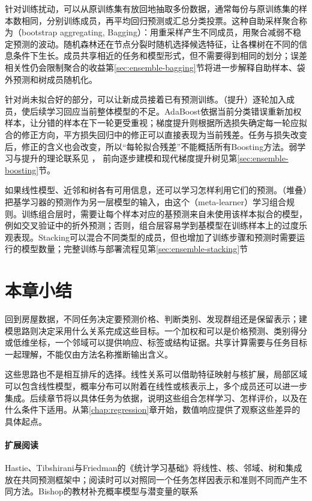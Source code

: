针对训练扰动，可以从原训练集有放回地抽取多份数据，通常每份与原训练集的样本数相同，分别训练成员，再平均回归预测或汇总分类投票。这种自助采样聚合称为（bootstrap aggregating, Bagging）：用重采样产生不同成员，用聚合减弱不稳定预测的波动。随机森林还在节点分裂时随机选择候选特征，让各棵树在不同的信息条件下生长。成员共享相近的任务和模型形式，但不需要得到相同的划分；误差相关性仍会限制聚合的收益第\ref{sec:ensemble-bagging}节将进一步解释自助样本、袋外预测和树成员随机化。

针对尚未拟合好的部分，可以让新成员接着已有预测训练。（提升）逐轮加入成员，使后续学习回应当前整体模型的不足。AdaBoost依据当前分类错误重新加权样本，让分错的样本在下一轮更受重视；梯度提升则根据所选损失确定每一轮应拟合的修正方向，平方损失回归中的修正可以直接表现为当前残差。任务与损失改变后，修正的含义也会改变，所以“每轮拟合残差”不能概括所有Boosting方法。弱学习与提升的理论联系见
，
前向逐步建模和现代梯度提升树见第\ref{sec:ensemble-boosting}节。

如果线性模型、近邻和树各有可用信息，还可以学习怎样利用它们的预测。（堆叠）把基学习器的预测作为另一层模型的输入，由这个（meta-learner）学习组合规则。训练组合层时，需要让每个样本对应的基预测来自未使用该样本拟合的模型，例如交叉验证中的折外预测；否则，组合层容易学到基模型在训练样本上的过度乐观表现。Stacking可以混合不同类型的成员，但也增加了训练步骤和预测时需要运行的模型数量；完整训练与部署流程见第\ref{sec:ensemble-stacking}节

\section{本章小结}
\label{sec:classic-overview-summary}

回到房屋数据，不同任务决定要预测价格、判断类别、发现群组还是保留表示；建模思路则决定采用什么关系完成这些目标。一个加权和可以是价格预测、类别得分或低维坐标，一个邻域可以提供响应、标签或结构证据。共享计算需要与任务目标一起理解，不能仅由方法名称推断输出含义。

这些思路也不是相互排斥的选择。线性关系可以借助特征映射与核扩展，局部区域可以包含线性模型，概率分布可以附着在线性或核表示上，多个成员还可以进一步集成。后续章节将以具体任务为依据，说明这些组合怎样学习、怎样评价，以及在什么条件下适用。从第\ref{chap:regression}章开始，数值响应提供了观察这些差异的具体起点。

\paragraph{扩展阅读}
Hastie、Tibshirani与Friedman的《统计学习基础》将线性、核、邻域、树和集成放在共同预测框架中；阅读时可以对照同一个任务怎样因表示和准则不同而产生不同方法。Bishop的教材补充概率模型与潜变量的联系

